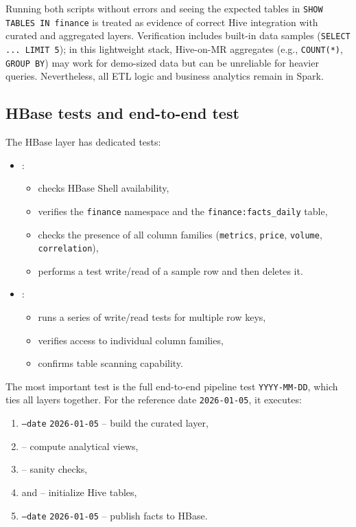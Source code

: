 \documentclass{article}
\begin{document}
Running both scripts without errors and seeing the expected tables in
\texttt{SHOW TABLES IN finance} is treated as evidence of correct Hive
integration with curated and aggregated layers. Verification includes
built-in data samples (\texttt{SELECT ... LIMIT 5}); in this lightweight
stack, Hive-on-MR aggregates (e.g., \texttt{COUNT(*)}, \texttt{GROUP BY})
may work for demo-sized data but can be unreliable for heavier queries.
Nevertheless, all ETL logic and business analytics remain in Spark.

\subsection{HBase tests and end-to-end test}

The HBase layer has dedicated tests:

\begin{itemize}
\item
  :

  \begin{itemize}
    \item
    checks HBase Shell availability,
  \item
    verifies the \texttt{finance} namespace and the
    \texttt{finance:facts\_daily} table,
  \item
    checks the presence of all column families (\texttt{metrics},
    \texttt{price}, \texttt{volume}, \texttt{correlation}),
  \item
    performs a test write/read of a sample row and then deletes it.
  \end{itemize}
\item
  :

  \begin{itemize}
    \item
    runs a series of write/read tests for multiple row keys,
  \item
    verifies access to individual column families,
  \item
    confirms table scanning capability.
  \end{itemize}
\end{itemize}

The most important test is the full end-to-end pipeline test
 \texttt{YYYY-MM-DD}, which ties
all layers together. For the reference date \texttt{2026-01-05}, it
executes:

\begin{enumerate}
\def\labelenumi{\arabic{enumi}.}
\item
   \texttt{--date} \texttt{2026-01-05} -- build the
  curated layer,
\item
   -- compute analytical views,
\item
   -- sanity checks,
\item
   and  -- initialize
  Hive tables,
\item
   \texttt{--date} \texttt{2026-01-05} -- publish
  facts to HBase.
\end{enumerate}
\end{document}
